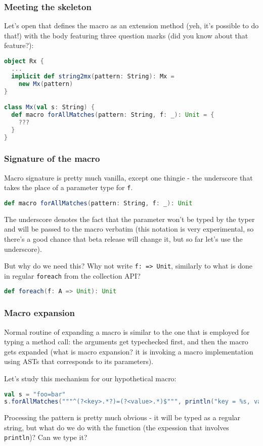\documentclass[hyperref={bookmarks=false}]{beamer}
\begin{document}
\begin{frame}[t,fragile]
\frametitle{Meeting the skeleton}

Let's open  that defines the macro as an extension method (yeh, it's possible to do that!) with the body featuring three question marks (did you know about that feature?):

\begin{lstlisting}[language=scala]
object Rx {
  ...
  implicit def string2mx(pattern: String): Mx =
    new Mx(pattern)
}

class Mx(val s: String) {
  def macro forAllMatches(pattern: String, f: _): Unit = {
    ???
  }
}
\end{lstlisting}
\end{frame}

\begin{frame}[t,fragile]
\frametitle{Signature of the macro}

Macro signature is pretty much vanilla, except one thingie - the underscore that takes the place of a parameter type for \texttt{f}.

\begin{lstlisting}[language=scala]
def macro forAllMatches(pattern: String, f: _): Unit
\end{lstlisting}

The underscore denotes the fact that the parameter won't be typed by the typer and will be passed to the macro verbatim (this notation is very experimental, so there's a good chance that beta release will change it, but so far let's use the underscore).

But why do we need this? Why not write \texttt{f: => Unit}, similarly to what is done in regular \texttt{foreach} from the collection API?

\begin{lstlisting}[language=scala]
def foreach(f: A => Unit): Unit
\end{lstlisting}
\end{frame}

\begin{frame}[t,fragile]
\frametitle{Macro expansion}

Normal routine of expanding a macro is similar to the one that is employed for typing a method call: the arguments get typechecked first, and then the macro gets expanded (what is macro expansion? it is invoking a macro implementation using ASTs that corresponds to its parameters).

Let's study this mechanism for our hypothetical macro:

\begin{lstlisting}[language=scala]
val s = "foo=bar"
s.forAllMatches("""^(?<key>.*?)=(?<value>.*)$""", println("key = %s, value = %s".format(key, value)))
\end{lstlisting}%

Processing the pattern is pretty much obvious - it will be typed as a regular string, but what do we do with the function (the expession that involves \texttt{println})? Can we type it?
\end{frame}
\end{document}

